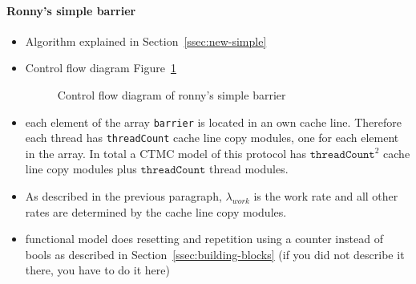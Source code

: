 \documentclass[a4paper, 10pt]{article}
\begin{document}
\begin{enumerate}
\paragraph{Ronny's simple barrier}
\label{ssssec:analysis-modelchecking-modelling-ronny-simple}
\begin{itemize}
	\item Algorithm explained in Section~\ref{ssec:new-simple}
	\item Control flow diagram Figure~\ref{fig:ronny-simple-control-flow}
		\begin{figure}[htbp]
			\centering
			
			\caption{Control flow diagram of ronny's simple barrier}
			\label{fig:ronny-simple-control-flow}
		\end{figure}
	\item each element of the array \texttt{barrier} is located in an own cache line. Therefore each thread has \texttt{threadCount} cache line copy modules, one for each element in the array. In total a CTMC model of this protocol has $\mathtt{threadCount}^2$ cache line copy modules plus $\mathtt{threadCount}$ thread modules.
	\item As described in the previous paragraph, $\lambda_{work}$ is the work rate and all other rates are determined by the cache line copy modules.
	\item functional model does resetting and repetition using a counter instead of bools as described in Section~\ref{ssec:building-blocks} (if you did not describe it there, you have to do it here)
\end{itemize}


\end{enumerate}
\end{document}
